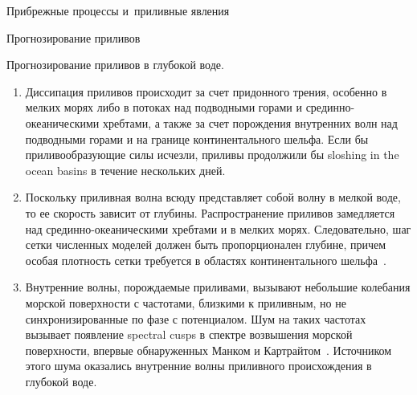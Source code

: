 \begin{chapter}{Прибрежные процессы и~приливные явления}
\begin{section}{Прогнозирование приливов}
\begin{paragraph}{Прогнозирование приливов в глубокой воде.}
\begin{enumerate}
\item 
Диссипация приливов происходит за счет придонного трения, особенно в мелких
морях либо в потоках над подводными горами и срединно-океаническими
хребтами, а также за счет порождения внутренних волн над подводными горами
и на границе континентального шельфа. Если бы приливообразующие силы
исчезли, приливы продолжили бы sloshing in the ocean basins 
в течение нескольких дней.
%

\item 
Поскольку приливная волна всюду представляет собой волну в мелкой воде,
то ее скорость зависит от глубины. Распространение приливов замедляется
над срединно-океаническими хребтами и в мелких морях. Следовательно,
шаг сетки численных моделей должен быть пропорционален глубине,
причем особая плотность сетки требуется в областях континентального 
шельфа~\cite{LeProvost:1994}.
%

\item 
Внутренние волны, порождаемые приливами, вызывают небольшие колебания морской
поверхности с частотами, близкими к приливным, но не синхронизированные
по фазе с потенциалом. 
Шум на таких частотах вызывает появление spectral cusps в спектре
возвышения морской поверхности, впервые обнаруженных Манком и 
Картрайтом~\cite{Munk:1966b}. Источником этого шума оказались
внутренние волны приливного происхождения в глубокой воде.
%
\end{enumerate}


\end{paragraph}
\end{section}
\end{chapter}
